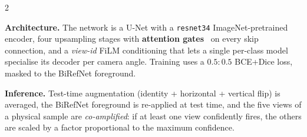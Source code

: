 \documentclass[11pt]{article}
\begin{document}
\begin{multicols}{2}

        \textbf{Architecture.} The network is a U-Net with a
        \texttt{resnet34} ImageNet-pretrained encoder, four upsampling stages
        with \textbf{attention gates}~\cite{oktay2018attentionunet} on every
        skip connection, and a \textit{view-id} FiLM conditioning that lets a
        single per-class model specialise its decoder per camera angle.
        Training uses a $0.5{:}0.5$ BCE+Dice loss, masked to the BiRefNet
        foreground.
        
        \textbf{Inference.} Test-time augmentation (identity + horizontal +
        vertical flip) is averaged, the BiRefNet foreground is re-applied at
        test time, and the five views of a physical sample are
        \emph{co-amplified}: if at least one view confidently fires, the
        others are scaled by a factor proportional to the maximum confidence.


\end{multicols}
\end{document}

